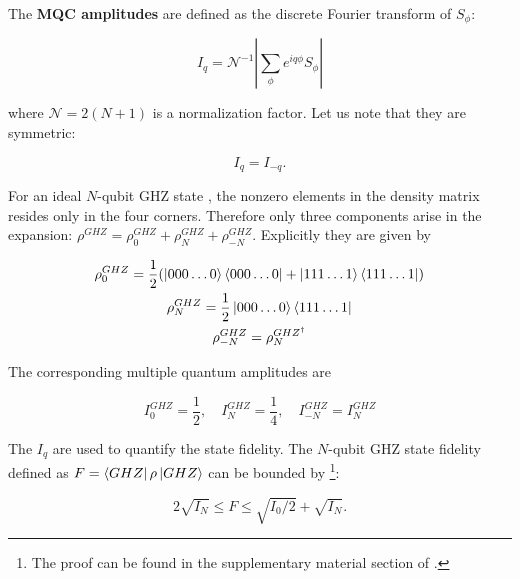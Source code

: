 The \textbf{MQC amplitudes} are defined as the discrete Fourier transform of $S_{\phi}$:

\begin{equation}
I_{q}= \mathcal{N}^{-1} | \sum_{\phi} e^{i q \phi} S_{\phi} | 
\label{I_q}
\end{equation} 

\noindent where $\mathcal{N} = 2(N+1)$ is a normalization factor. Let us note that they are symmetric: 

\begin{equation}
I_q=I_{-q}.
\label{I_q_2}
\end{equation} 

\noindent For an ideal $N$-qubit GHZ state , the nonzero elements in the density matrix resides only in the four corners. Therefore only three components arise in the expansion:
$\rho^{GHZ} = \rho_0^{GHZ} + \rho_N^{GHZ} + \rho_{-N}^{GHZ}$. Explicitly they are given by

\begin{equation}
   \begin{gathered}
 \rho_0^{GHZ}  = \frac{1}{2} ( \left| 000\dots0 \right \rangle\left\langle 000\dots0 \right | + \left| 111\dots1 \right \rangle\left\langle 111\dots1 \right |)  \\
\rho_N^{GHZ}  = \frac{1}{2} \left| 000\dots0 \right \rangle\left\langle 111\dots1 \right |  \\
 \rho_{-N}^{GHZ} = \rho_N^{GHZ^{\dagger}} 
	\end{gathered}
\end{equation} 

\noindent The corresponding multiple quantum amplitudes are 


\begin{equation}
I_0^{GHZ} = \frac{1}{2}, \quad I_N^{GHZ} = \frac{1}{4}, \quad  I_{-N}^{GHZ} =  I_N^{GHZ}
\end{equation} 


\noindent The $I_q$ are used to quantify the state fidelity. The $N$-qubit GHZ state fidelity defined as $ F= \left\langle GHZ \right | \rho \left| GHZ \right \rangle $ can be bounded by \footnote{The proof can be found in the supplementary material section of \cite{Article}.}:

\begin{equation}
 2 \sqrt{I_N} \leq F \leq \sqrt{I_0/2} + \sqrt{I_N}.
 \label{Fidelity_Bounded}
 \end{equation}

